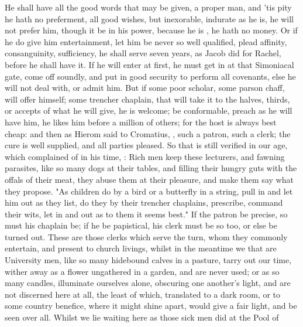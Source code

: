 He shall have all the good words that may be given, a
proper man, and 'tis pity he hath no preferment, all good wishes, but
inexorable, indurate as he is, he will not prefer him, though it be in his
power, because he is , he hath no money. Or if he do give him
entertainment, let him be never so well qualified, plead affinity,
consanguinity, sufficiency, he shall serve seven years, as Jacob did for
Rachel, before he shall have it. If he will enter at
first, he must get in at that Simoniacal gate, come off soundly, and put in
good security to perform all covenants, else he will not deal with, or admit
him. But if some poor scholar, some parson chaff, will offer himself; some
trencher chaplain, that will take it to the halves, thirds, or accepts of what
he will give, he is welcome; be conformable, preach as he will have him, he
likes him before a million of others; for the host is always best cheap: and
then as Hierom said to Cromatius, , such a patron,
such a clerk; the cure is well supplied, and all parties pleased. So that is
still verified in our age, which \Chrysostom{} complained of
in his time, : Rich
men keep these lecturers, and fawning parasites, like so many dogs at their
tables, and filling their hungry guts with the offals of their meat, they abuse
them at their pleasure, and make them say what they propose.
"As children do by a bird or a butterfly in a string, pull
in and let him out as they list, do they by their trencher chaplains,
prescribe, command their wits, let in and out as to them it seems best." If the
patron be precise, so must his chaplain be; if he be papistical, his clerk must
be so too, or else be turned out. These are those clerks which serve the turn,
whom they commonly entertain, and present to church livings, whilst in the
meantime we that are University men, like so many hidebound calves in a
pasture, tarry out our time, wither away as a flower ungathered in a garden,
and are never used; or as so many candles, illuminate ourselves alone,
obscuring one another's light, and are not discerned here at all, the least of
which, translated to a dark room, or to some country benefice, where it might
shine apart, would give a fair light, and be seen over all. Whilst we lie
waiting here as those sick men did at the Pool of

